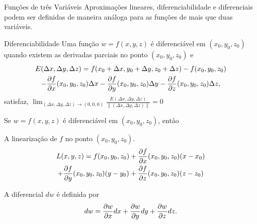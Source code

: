 \begin{frame}[label=der-parciais]{Funções de três Variáveis}
Aproximações lineares, diferenciabilidade e diferenciais podem ser definidas de maneira análoga para as funções de mais que duas variáveis. 
\medskip


\begin{block}{Diferenciabilidade}
Uma função  $w=f(x,y,z)$ é {\color{blue} diferenciável em $(x_0,y_0,z_0)$} quando existem as derivadas parciais no ponto $(x_0,y_0,z_0)$ e 
\begin{multline*}
 E(\Delta x,\Delta y,\Delta z)=
 f(x_0+\Delta x,y_0+\Delta y,z_0+\Delta z)-f(x_0,y_0,z_0)\\-\frac{\partial f}{\partial x}(x_0,y_0,z_0)\Delta x-\frac{\partial f}{\partial y}(x_0,y_0,z_0) \Delta y-\frac{\partial f}{\partial z}(x_0,y_0,z_0)\Delta z,
\end{multline*}
satisfaz, $\displaystyle\lim_{(\Delta x,\Delta y,\Delta z)\to(0,0,0)}\frac{E(\Delta x,\Delta y,\Delta z)}{\|(\Delta x,\Delta y,\Delta z)\|}=0$
\end{block}



\end{frame}



\begin{frame}[label=der-parciais]
Se $w=f(x,y,z)$ é diferenciável em $(x_0,y_0,z_0)$, então 
\bigskip

A {\color{blue}linearização} de $f$ no ponto $(x_0,y_0,z_0)$. 
{\color{blue}\begin{multline*}
L(x,y,z)=f(x_0,y_0,z_0)+\frac{\partial f}{\partial x}(x_0,y_0,z_0)(x-x_0)\\+\frac{\partial f}{\partial y}(x_0,y_0,z_0)(y-y_0)+\frac{\partial f}{\partial z}(x_0,y_0,z_0)(z-z_0)
\end{multline*}}

A {\color{blue}diferencial $dw$}  é definida por
{\color{blue}
\[dw=\frac{\partial w}{\partial x}dx+\frac{\partial w}{\partial y}dy+\frac{\partial w}{\partial z}dz.\]}



\end{frame}


